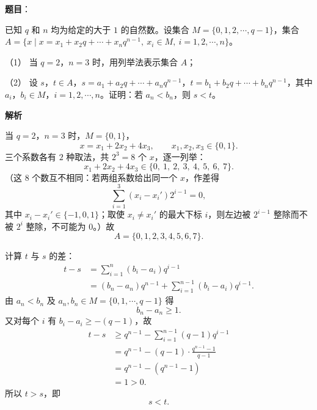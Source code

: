 \begin{answer}

\textbf{题目}：

已知 $q$ 和 $n$ 均为给定的大于 $1$ 的自然数。设集合 $M=\{0,1,2,\cdots,q-1\}$，集合 $A=\{x\mid x=x_1+x_2q+\cdots+x_nq^{n-1},\ x_i\in M,\ i=1,2,\cdots,n\}$。

（1） 当 $q=2$，$n=3$ 时，用列举法表示集合 $A$；

（2） 设 $s$，$t\in A$，$s=a_1+a_2q+\cdots+a_nq^{n-1}$，$t=b_1+b_2q+\cdots+b_nq^{n-1}$，其中 $a_i$，$b_i\in M$，$i=1,2,\cdots,n$。证明：若 $a_n<b_n$，则 $s<t$。

\textbf{解析}


当 $q=2$，$n=3$ 时，$M=\{0,1\}$，
\nopagebreak[4]
\[x=x_1+2x_2+4x_3,\qquad x_1,x_2,x_3\in\{0,1\}.\]
三个系数各有 $2$ 种取法，共 $2^3=8$ 个 $x$，逐一列举：
\nopagebreak[4]
\[x_1+2x_2+4x_3\in\{0,\ 1,\ 2,\ 3,\ 4,\ 5,\ 6,\ 7\}.\]
（这 $8$ 个数互不相同：若两组系数给出同一个 $x$，作差得
\nopagebreak[4]
\[\sum_{i=1}^{3}(x_i-x_i')2^{i-1}=0,\]
其中 $x_i-x_i'\in\{-1,0,1\}$；取使 $x_i\neq x_i'$ 的最大下标 $i$，则左边被 $2^{i-1}$ 整除而不被 $2^{i}$ 整除，不可能为 $0$。）故
\nopagebreak[4]
\[A=\{0,1,2,3,4,5,6,7\}.\]


计算 $t$ 与 $s$ 的差：
\nopagebreak[4]
\[\begin{aligned}
t-s&=\sum_{i=1}^{n}\left(b_i-a_i\right)q^{i-1}\\
&=\left(b_n-a_n\right)q^{n-1}+\sum_{i=1}^{n-1}\left(b_i-a_i\right)q^{i-1}.
\end{aligned}\]
由 $a_n<b_n$ 及 $a_n,b_n\in M=\{0,1,\cdots,q-1\}$ 得
\nopagebreak[4]
\[b_n-a_n\geqslant 1.\]
又对每个 $i$ 有 $b_i-a_i\geqslant -(q-1)$，故
\nopagebreak[4]
\[\begin{aligned}
t-s&\geqslant q^{n-1}-\sum_{i=1}^{n-1}(q-1)q^{i-1}\\
&=q^{n-1}-(q-1)\cdot\frac{q^{n-1}-1}{q-1}\\
&=q^{n-1}-\left(q^{n-1}-1\right)\\
&=1>0.
\end{aligned}\]
所以 $t>s$，即
\nopagebreak[4]
\[s<t.\]



\end{answer}